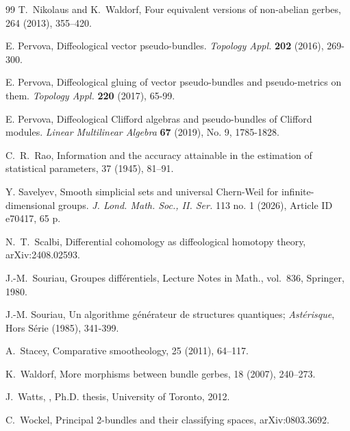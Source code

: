 \documentclass[11pt]{amsart}
\begin{document}
\begin{thebibliography}{99}
T.~Nikolaus and K.~Waldorf,
\newblock Four equivalent versions of non-abelian gerbes,
 264 (2013), 355--420.

E. Pervova,
\newblock Diffeological vector pseudo-bundles. 
\newblock \emph{Topology Appl.} {\bf 202} (2016), 269-300.

E. Pervova,
\newblock Diffeological gluing of vector pseudo-bundles and pseudo-metrics on them. 
\newblock \emph{Topology Appl.} {\bf 220} (2017), 65-99. 

E. Pervova, 
\newblock Diffeological Clifford algebras and pseudo-bundles of Clifford modules. \newblock \emph{Linear Multilinear Algebra} {\bf 67} (2019), No. 9, 1785-1828. 


C.~R.~Rao,
\newblock Information and the accuracy attainable in the estimation of statistical parameters,
 37 (1945), 81--91.

Y. Savelyev,
\newblock Smooth simplicial sets and universal Chern-Weil for infinite-dimensional groups. 
\newblock \emph{J. Lond. Math. Soc., II. Ser.} 113 no. 1 (2026), Article ID e70417, 65 p. 

N.~T.~Scalbi,
\newblock Differential cohomology as diffeological homotopy theory,
\newblock arXiv:2408.02593.

J.-M.~Souriau,
\newblock Groupes diff\'erentiels,
\newblock Lecture Notes in Math., vol.~836, Springer, 1980.

	 J.-M. Souriau, Un algorithme g\'en\'erateur de structures quantiques; 
		\textit{Ast\'erisque}, Hors S\'erie (1985), 341-399.

A.~Stacey,
\newblock Comparative smootheology,
 25 (2011), 64--117.

K.~Waldorf,
\newblock More morphisms between bundle gerbes,
 18 (2007), 240--273.

J.~Watts,
,
\newblock Ph.D. thesis, University of Toronto, 2012.

C.~Wockel,
\newblock Principal 2-bundles and their classifying spaces,
\newblock arXiv:0803.3692.

\end{thebibliography}
\end{document}
